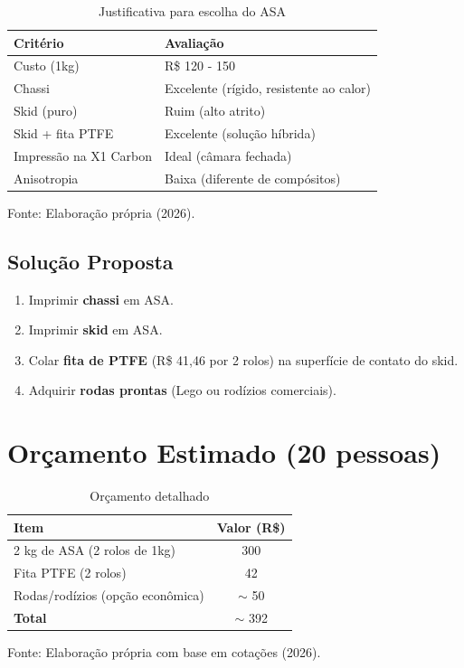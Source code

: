\documentclass[12pt, a4paper]{article}
\newcommand{\fonte}[1]{\vspace{0.2cm}\par\noindent\fontsize{9}{11}\selectfont Fonte: #1}
\begin{document}
\begin{table}[h]
\centering
\caption{Justificativa para escolha do ASA}
\label{tab:justificativa}
\begin{tabular}{l|l}
\hline
\textbf{Critério} & \textbf{Avaliação} \\ \hline
Custo (1kg) & R\$ 120 - 150 \\
Chassi & Excelente (rígido, resistente ao calor) \\
Skid (puro) & Ruim (alto atrito) \\
Skid + fita PTFE & Excelente (solução híbrida) \\
Impressão na X1 Carbon & Ideal (câmara fechada) \\
Anisotropia & Baixa (diferente de compósitos) \\ \hline
\end{tabular}
\fonte{Elaboração própria (2026).}
\end{table}

\subsection*{Solução Proposta}

\begin{enumerate}
    \item Imprimir \textbf{chassi} em ASA.
    \item Imprimir \textbf{skid} em ASA.
    \item Colar \textbf{fita de PTFE} (R\$ 41,46 por 2 rolos) na superfície de contato do skid.
    \item Adquirir \textbf{rodas prontas} (Lego ou rodízios comerciais).
\end{enumerate}

\section{Orçamento Estimado (20 pessoas)}

\begin{table}[h]
\centering
\caption{Orçamento detalhado}
\label{tab:orcamento}
\begin{tabular}{l|c}
\hline
\textbf{Item} & \textbf{Valor (R\$)} \\ \hline
2 kg de ASA (2 rolos de 1kg) & 300 \\
Fita PTFE (2 rolos) & 42 \\
Rodas/rodízios (opção econômica) & $\sim$ 50 \\
\textbf{Total} & $\sim$ 392 \\ \hline
\end{tabular}
\fonte{Elaboração própria com base em cotações (2026).}
\end{table}
\end{document}
